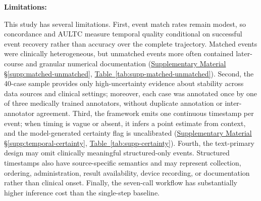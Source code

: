 \documentclass{ws-procs11x85}
\newif\ifshowrebuttalcolor
\newcommand{\rebuttal}[1]{%
  \ifshowrebuttalcolor
    \textcolor{rebuttalblue}{#1}%
  \else
    #1%
  \fi
}
\begin{document}
\vspace{5pt}
\noindent\textbf{Limitations:} 
\rebuttal{This study has several limitations. First, event match rates remain modest, so concordance and AULTC measure temporal quality conditional on successful event recovery rather than accuracy over the complete trajectory. Matched events were clinically heterogeneous, but unmatched events more often contained later-course and granular numerical documentation (\hyperref[supp:matched-unmatched]{Supplementary Material \S\ref*{supp:matched-unmatched}}, \hyperref[tab:supp-matched-unmatched]{Table~\ref*{tab:supp-matched-unmatched}}). Second, the 40-case sample provides only high-uncertainty evidence about stability across data sources and clinical
settings; moreover, each case was annotated once by one of three medically trained annotators, without duplicate annotation or inter-annotator agreement. Third, the framework emits one continuous timestamp per event; when timing is vague or absent, it infers a point estimate from context, and the model-generated certainty flag is uncalibrated (\hyperref[supp:temporal-certainty]{Supplementary Material \S\ref*{supp:temporal-certainty}}, \hyperref[tab:supp-certainty]{Table~\ref*{tab:supp-certainty}}). Fourth, the text-primary design may omit clinically meaningful structured-only events. Structured timestamps also have source-specific semantics and may represent collection, ordering, administration, result availability, device recording, or
documentation rather than clinical onset. Finally, the seven-call workflow has substantially higher inference cost than the single-step baseline.}


\end{document}
